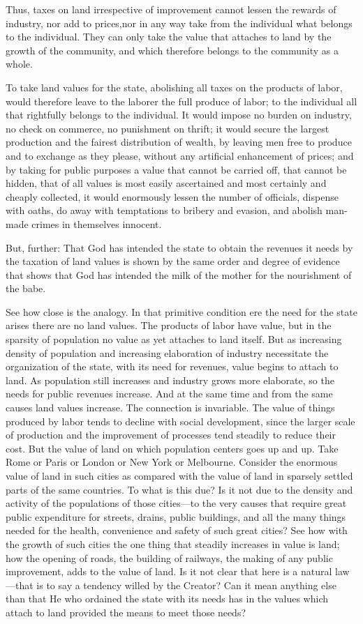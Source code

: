 \documentclass{book}
\begin{document}
Thus, taxes on land irrespective of improvement cannot lessen the rewards of industry, nor add to prices,\footnotemark[1] nor in any way take from the individual what belongs to the individual. They can only take the value that attaches to land by the growth of the community, and which therefore belongs to the community as a whole.

To take land values for the state, abolishing all taxes on the products of labor, would therefore leave to the laborer the full produce of labor; to the individual all that rightfully belongs to the individual. It would impose no burden on industry, no check on commerce, no punishment on thrift; it would secure the largest production and the fairest distribution of wealth, by leaving men free to produce and to exchange as they please, without any artificial enhancement of prices; and by taking for public purposes a value that cannot be carried off, that cannot be hidden, that of all values is most easily ascertained and most certainly and cheaply collected, it would enormously lessen the number of officials, dispense with oaths, do away with temptations to bribery and evasion, and abolish man-made crimes in themselves innocent.

But, further: That God has intended the state to obtain the revenues it needs by the taxation of land values is shown by the same order and degree of evidence that shows that God has intended the milk of the mother for the nourishment of the babe.

See how close is the analogy. In that primitive condition ere the need for the state arises there are no land values. The products of labor have value, but in the sparsity of population no value as yet attaches to land itself. But as increasing density of population and increasing elaboration of industry necessitate the organization of the state, with its need for revenues, value begins to attach to land. As population still increases and industry grows more elaborate, so the needs for public revenues increase. And at the same time and from the same causes land values increase. The connection is invariable. The value of things produced by labor tends to decline with social development, since the larger scale of production and the improvement of processes tend steadily to reduce their cost. But the value of land on which population centers goes up and up. Take Rome or Paris or London or New York or Melbourne. Consider the enormous value of land in such cities as compared with the value of land in sparsely settled parts of the same countries. To what is this due? Is it not due to the density and activity of the populations of those cities—to the very causes that require great public expenditure for streets, drains, public buildings, and all the many things needed for the health, convenience and safety of such great cities? See how with the growth of such cities the one thing that steadily increases in value is land; how the opening of roads, the building of railways, the making of any public improvement, adds to the value of land. Is it not clear that here is a natural law—that is to say a tendency willed by the Creator? Can it mean anything else than that He who ordained the state with its needs has in the values which attach to land provided the means to meet those needs?
\end{document}
